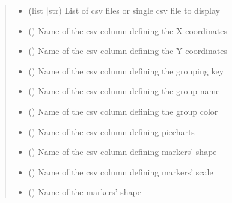 \documentclass[letterpaper,10pt,english,openany,oneside]{sphinxmanual}
\begin{document}
\begin{fulllineitems}
\begin{quote}
\begin{description}
\begin{itemize}
\item {} 
\sphinxAtStartPar
{} (list {\color{red}\bfseries{}|}str) \textendash{} List of csv files or single csv file to display

\item {} 
\sphinxAtStartPar
{} () \textendash{} Name of the csv column defining the X coordinates

\item {} 
\sphinxAtStartPar
{} () \textendash{} Name of the csv column defining the Y coordinates

\item {} 
\sphinxAtStartPar
{} () \textendash{} Name of the csv column defining the grouping key

\item {} 
\sphinxAtStartPar
{} () \textendash{} Name of the csv column defining the group name

\item {} 
\sphinxAtStartPar
{} () \textendash{} Name of the csv column defining the group color

\item {} 
\sphinxAtStartPar
{} () \textendash{} Name of the csv column defining pie\sphinxhyphen{}charts

\item {} 
\sphinxAtStartPar
{} () \textendash{} Name of the csv column defining markers’ shape

\item {} 
\sphinxAtStartPar
{} () \textendash{} Name of the csv column defining markers’ scale

\item {} 
\sphinxAtStartPar
{} () \textendash{} Name of the markers’ shape


\end{itemize}
\end{description}
\end{quote}
\end{fulllineitems}
\end{document}
